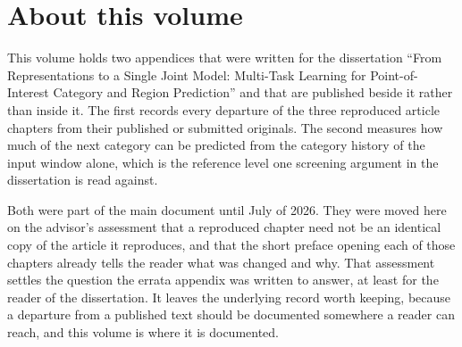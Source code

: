 \documentclass[
    12pt,
    openright,
    oneside,
    a4paper,
    sumario=tradicional,
    brazil,
    english,
]{abntex2}
\renewcommand{\contentsname}{Contents}
\begin{document}
    \frenchspacing
    \OnehalfSpacing

    \pretextual
    {
        \singlespacing
        \imprimirfolhaderosto
        \clearpage
    }

    \pdfbookmark[0]{\contentsname}{toc}
    \tableofcontents*
    \cleardoublepage

    \textual

\chapter*{About this volume}
\hypertarget{ext:dissertation}{}

This volume holds two appendices that were written for the dissertation ``From
Representations to a Single Joint Model: Multi-Task Learning for Point-of-Interest Category
and Region Prediction'' and that are published beside it rather than inside it. The first
records every departure of the three reproduced article chapters from their published or
submitted originals. The second measures how much of the next category can be predicted from
the category history of the input window alone, which is the reference level one screening
argument in the dissertation is read against.

Both were part of the main document until July of 2026. They were moved here on the
advisor's assessment that a reproduced chapter need not be an identical copy of the article
it reproduces, and that the short preface opening each of those chapters already tells the
reader what was changed and why. That assessment settles the question the errata appendix
was written to answer, at least for the reader of the dissertation. It leaves the underlying
record worth keeping, because a departure from a published text should be documented
somewhere a reader can reach, and this volume is where it is documented.
\end{document}
